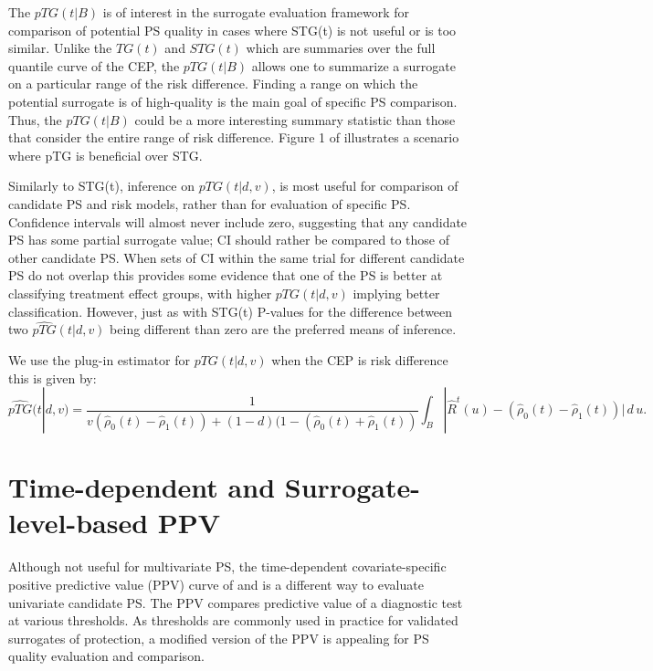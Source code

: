 \documentclass[times, 11pt]{article}
\begin{document}
The $pTG(t|B)$ is of interest in the surrogate evaluation framework for comparison of potential PS quality in cases where STG(t) is not useful or is too similar. Unlike the $TG(t)$ and $STG(t)$ which are summaries over the full quantile curve of the CEP, the $pTG(t|B)$ allows one to summarize a surrogate on a particular range of the risk difference. Finding a range on which the potential surrogate is of high-quality is the main goal of specific PS comparison. Thus, the $pTG(t|B)$ could be a more interesting summary statistic than those that consider the entire range of risk difference. Figure 1 of \citep{Sachs12} illustrates a scenario where pTG is beneficial over STG. 

Similarly to STG(t), inference on $pTG(t|d,v)$, is most useful for comparison of candidate PS and risk models, rather than for evaluation of specific PS. Confidence intervals will almost never include zero, suggesting that any candidate PS has some partial surrogate value; CI should rather be compared to those of other candidate PS. When sets of CI within the same trial for different candidate PS do not overlap this provides some evidence that one of the PS is better at classifying treatment effect groups, with higher $pTG(t|d,v)$ implying better classification. However, just as with STG(t) P-values for the difference between two $\widehat{pTG}(t|d,v)$ being different than zero are the preferred means of inference. 

We use the plug-in estimator for $pTG(t|d,v)$ when the CEP is risk difference this is given by:
\[
\widehat{pTG}(t|d,v) = \frac{1}{v(\widehat{\rho}_0(t)-\widehat{\rho}_1(t)) + (1-d)(1-(\widehat{\rho}_0(t)+\widehat{\rho}_1(t))}\int_{B} |\widehat{R}^t(u) - (\widehat{\rho}_0(t)-\widehat{\rho}_1(t))|\, d\, u.
\]

\section{Time-dependent and Surrogate-level-based PPV}
Although not useful for multivariate PS, the time-dependent covariate-specific positive predictive value (PPV) curve of \citet{Zheng08} and \citet{Zheng10} is a different way to evaluate univariate candidate PS. The PPV compares predictive value of a diagnostic test at various thresholds. As thresholds are commonly used in practice for validated surrogates of protection, a modified version of the PPV is appealing for PS quality evaluation and comparison. 
\end{document}
